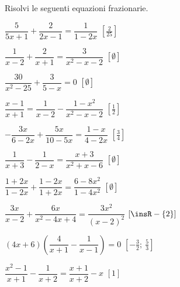 \begin{esercizio}[\Ast]
\label{ese:20.21}
Risolvi le seguenti equazioni frazionarie.
\begin{multicols}{2}
\begin{enumeratea}
 \item $\dfrac{5}{5x+1}+\dfrac{2}{2x-1}=\dfrac{1}{1-2x}$
  \hfill $\left[\frac{2}{25}\right]$
 \item $\dfrac{1}{x-2}+\dfrac{2}{x+1}=\dfrac{3}{x^{2}-x-2}$
  \hfill $\left[\emptyset\right]$
 \item $\dfrac{30}{x^{2}-25}+\dfrac{3}{5-x}=0$
  \hfill $\left[\emptyset\right]$
 \item $\dfrac{x-1}{x+1}=\dfrac{1}{x-2}-\dfrac{1-x^{2}}{x^{2}-x-2}$
  \hfill $\left[\frac{1}{2}\right]$
 \item $-{\dfrac{3x}{6-2x}}+\dfrac{5x}{10-5x}=\dfrac{1-x}{4-2x}$
  \hfill $\left[\frac{3}{4}\right]$
 \item $\dfrac{1}{x+3}-\dfrac{1}{2-x}=\dfrac{x+3}{x^{2}+x-6}$
  \hfill $\left[\emptyset\right]$
 \item $\dfrac{1+2x}{1-2x}+\dfrac{1-2x}{1+2x}=\dfrac{6-8x^{2}}{1-4x^{2}}$
  \hfill $\left[\emptyset\right]$
 \item $\dfrac{3x}{x-2}+\dfrac{6x}{x^{2}-4x+4}=\dfrac{3x^{2}}{(x-2)^{2}}$
  \hfill $\left[\insR-\{2\}\right]$
 \item $(4x+6)\left(\dfrac{4}{x+1}-\dfrac{1}{x-1}\right)=0$
  \hfill $\left[-{\frac{3}{2}};~\frac{5}{3}\right]$
 \item $\dfrac{x^{2}-1}{x+1}-\dfrac{1}{x+2}=\dfrac{x+1}{x+2}-x$
  \hfill $\left[1\right]$
\end{enumeratea}
\end{multicols}
\end{esercizio}

